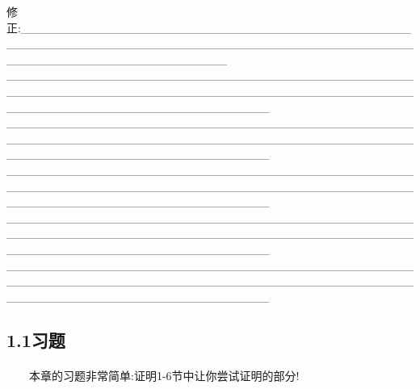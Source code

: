 { 修正:}\_\_\_\_\_\_\_\_\_\_\_\_\_\_\_\_\_\_\_\_\_\_\_\_\_\_\_\_\_\_\_\_\_\_\_\_\_\_\_\_\_\_\_\_\_\_\_\_\_\_\_\_\_\_\_\_\_\_\_\_\_\_\_\_\_\_\_\_\_\_\_\_\_\_\_\_\_\_\_\_\_\_\_\_\_\_\_\_\_\_\_\_\_\_\_\_\_\_\_\_\_\_\_\_\_\_\_\_\_\_\_\_\_\_\_\_\_\_\_\_\\\_\_\_\_\_\_\_\_\_\_\_\_\_\_\_\_\_\_\_\_\_\_\_\_\_\_\_\_\_\_\_\_\_\_\_\_\_\_\_\_\_\_\_\_\_\_\_\_\_\_\_\_\_\_\_\_\_\_\_\_\_\_\_\_\_\_\_\_\_\_\_\_\_\_\_\_\_\_\_\_\_\_\_\_\_\_\_\_\_\_\_\_\_\_\_\_\_\_\_\_\_\_\_\_\_\_\_\_\_\_\_\_\_\_\_\_\_\_\_\_\_\_\_\_\_\_\_\\\_\_\_\_\_\_\_\_\_\_\_\_\_\_\_\_\_\_\_\_\_\_\_\_\_\_\_\_\_\_\_\_\_\_\_\_\_\_\_\_\_\_\_\_\_\_\_\_\_\_\_\_\_\_\_\_\_\_\_\_\_\_\_\_\_\_\_\_\_\_\_\_\_\_\_\_\_\_\_\_\_\_\_\_\_\_\_\_\_\_\_\_\_\_\_\_\_\_\_\_\_\_\_\_\_\_\_\_\_\_\_\_\_\_\_\_\_\_\_\_\_\_\_\_\_\_\_\\\_\_\_\_\_\_\_\_\_\_\_\_\_\_\_\_\_\_\_\_\_\_\_\_\_\_\_\_\_\_\_\_\_\_\_\_\_\_\_\_\_\_\_\_\_\_\_\_\_\_\_\_\_\_\_\_\_\_\_\_\_\_\_\_\_\_\_\_\_\_\_\_\_\_\_\_\_\_\_\_\_\_\_\_\_\_\_\_\_\_\_\_\_\_\_\_\_\_\_\_\_\_\_\_\_\_\_\_\_\_\_\_\_\_\_\_\_\_\_\_\_\_\_\_\_\_\_\\\_\_\_\_\_\_\_\_\_\_\_\_\_\_\_\_\_\_\_\_\_\_\_\_\_\_\_\_\_\_\_\_\_\_\_\_\_\_\_\_\_\_\_\_\_\_\_\_\_\_\_\_\_\_\_\_\_\_\_\_\_\_\_\_\_\_\_\_\_\_\_\_\_\_\_\_\_\_\_\_\_\_\_\_\_\_\_\_\_\_\_\_\_\_\_\_\_\_\_\_\_\_\_\_\_\_\_\_\_\_\_\_\_\_\_\_\_\_\_\_\_\_\_\_\_\_\_\\\_\_\_\_\_\_\_\_\_\_\_\_\_\_\_\_\_\_\_\_\_\_\_\_\_\_\_\_\_\_\_\_\_\_\_\_\_\_\_\_\_\_\_\_\_\_\_\_\_\_\_\_\_\_\_\_\_\_\_\_\_\_\_\_\_\_\_\_\_\_\_\_\_\_\_\_\_\_\_\_\_\_\_\_\_\_\_\_\_\_\_\_\_\_\_\_\_\_\_\_\_\_\_\_\_\_\_\_\_\_\_\_\_\_\_\_\_\_\_\_\_\_\_\_\_\_\_\\
 \subsection{1.1习题}
 \paragraph{}\ \ \ \ 本章的习题非常简单:证明1-6节中让你尝试证明的部分!